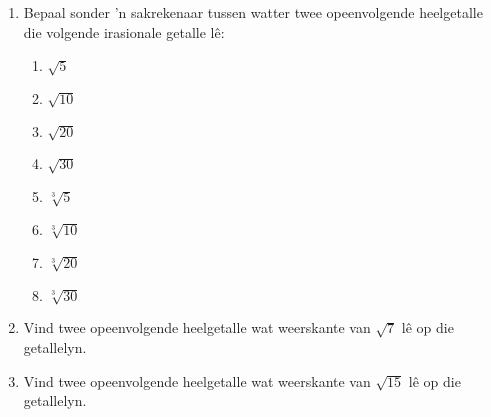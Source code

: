 \begin{eocexercises}{}
\begin{enumerate}[itemsep=5pt, label=\textbf{\arabic*}. ]
\item Bepaal sonder 'n sakrekenaar tussen watter twee opeenvolgende heelgetalle die volgende irasionale getalle l\^{e}:
\begin{multicols}{2}
    \begin{enumerate}[itemsep=5pt, label=\textbf{\alph*}. ] 
    \item $\sqrt{5}$ 
    \item $\sqrt{10}$ 
    \item $\sqrt{20}$ 
    \item $\sqrt{30}$ 
    \item $\sqrt[3]{5}$ 
    \item $\sqrt[3]{10}$ 
    \item $\sqrt[3]{20}$ 
    \item $\sqrt[3]{30}$ 
    \end{enumerate}
\end{multicols}

\item  Vind twee opeenvolgende heelgetalle wat weerskante van $\sqrt{7}$ lê op die getallelyn.          
\item Vind twee opeenvolgende heelgetalle wat weerskante van $\sqrt{15}$ lê op die getallelyn.          





\end{enumerate}
\end{eocexercises}
